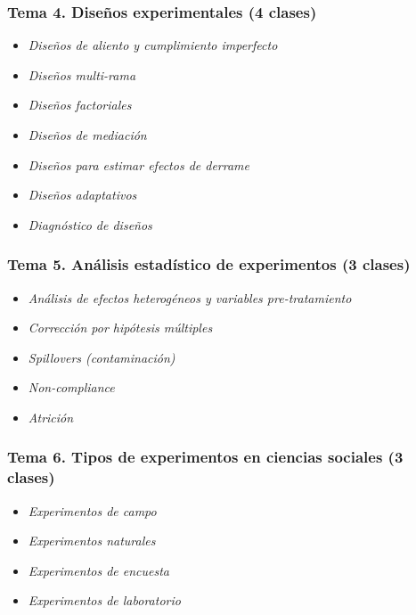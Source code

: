 \documentclass[
  12pt,
]{article}
\providecommand{\tightlist}{%
  \setlength{\itemsep}{0pt}\setlength{\parskip}{0pt}}
\begin{document}
\hypertarget{tema-4.-diseuxf1os-experimentales-4-clases-1}{%
\subsubsection{Tema 4. Diseños experimentales (4
clases)}\label{tema-4.-diseuxf1os-experimentales-4-clases-1}}

\begin{itemize}
\tightlist
\item
  \emph{Diseños de aliento y cumplimiento imperfecto}
\item
  \emph{Diseños multi-rama}
\item
  \emph{Diseños factoriales}
\item
  \emph{Diseños de mediación}
\item
  \emph{Diseños para estimar efectos de derrame}
\item
  \emph{Diseños adaptativos}
\item
  \emph{Diagnóstico de diseños}
\end{itemize}

\hypertarget{tema-5.-anuxe1lisis-estaduxedstico-de-experimentos-3-clases-1}{%
\subsubsection{Tema 5. Análisis estadístico de experimentos (3
clases)}\label{tema-5.-anuxe1lisis-estaduxedstico-de-experimentos-3-clases-1}}

\begin{itemize}
\tightlist
\item
  \emph{Análisis de efectos heterogéneos y variables pre-tratamiento}
\item
  \emph{Corrección por hipótesis múltiples}
\item
  \emph{Spillovers (contaminación)}
\item
  \emph{Non-compliance}
\item
  \emph{Atrición}
\end{itemize}

\hypertarget{tema-6.-tipos-de-experimentos-en-ciencias-sociales-3-clases-1}{%
\subsubsection{Tema 6. Tipos de experimentos en ciencias sociales (3
clases)}\label{tema-6.-tipos-de-experimentos-en-ciencias-sociales-3-clases-1}}

\begin{itemize}
\tightlist
\item
  \emph{Experimentos de campo}
\item
  \emph{Experimentos naturales}
\item
  \emph{Experimentos de encuesta}
\item
  \emph{Experimentos de laboratorio}
\end{itemize}
\end{document}
